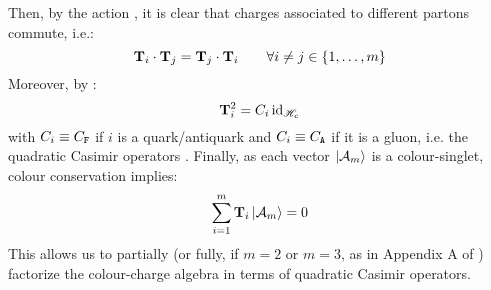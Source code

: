 Then, by the action , it is clear that charges associated to different partons commute, i.e.:
\begin{equation}
  \mathbf{T}_i \cdot \mathbf{T}_j = \mathbf{T}_j \cdot \mathbf{T}_i
  \qquad
  \forall i \neq j \in \{1, \dots, m\}
\end{equation}
Moreover, by :
\begin{equation}
  \mathbf{T}_i^2 = C_i \operatorname{id}_{\mathscr{H}_c}
\end{equation}
with $ C_i \equiv C_\mathtt{F} $ if $ i $ is a quark/antiquark and $ C_i \equiv C_\mathtt{A} $ if it is a gluon, i.e. the quadratic Casimir operators . Finally, as each vector $ \ket{\mathcal{A}_m} $ is a colour-singlet, colour conservation implies:
\begin{equation}
  \sum_{i = 1}^{m} \mathbf{T}_i \ket{\mathcal{A}_m} = 0
  \label{eq:col-cons}
\end{equation}
This allows us to partially (or fully, if $ m = 2 $ or $ m = 3 $, as in Appendix A of \cite{Catani-1997}) factorize the colour-charge algebra in terms of quadratic Casimir operators.











